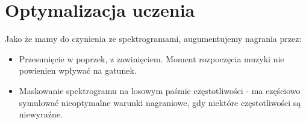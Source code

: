 \section{Optymalizacja uczenia}


Jako że mamy do czynienia ze spektrogramami, augumentujemy nagrania przez:

\begin{itemize}
    \item Przesunięcie w poprzek, z zawinięciem. Moment rozpoczęcia muzyki nie powienien wpływać na gatunek.
    \item Maskowanie spektrogramu na losowym paśmie częstotliwości - ma częściowo symulować nieoptymalne warunki nagraniowe, gdy niektóre częstotliwości są niewyraźne.
\end{itemize}